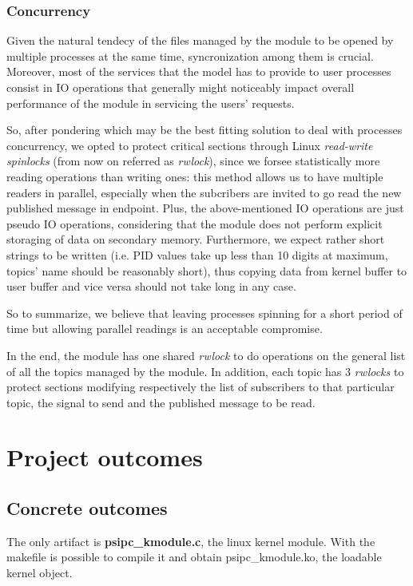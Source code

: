 \documentclass[10pt,a4]{article}
\begin{document}
\subsubsection*{Concurrency}
Given the natural tendecy of the files managed by the module to be opened by multiple processes at the same time, syncronization among them is crucial. Moreover, most of the services that the model has to provide to user processes consist in IO operations that generally might noticeably impact overall performance of the module in servicing the users' requests. 

So, after pondering which may be the best fitting solution to deal with processes concurrency, we opted to protect critical sections through Linux \textit{read-write spinlocks} (from now on referred as \textit{rwlock}), since we forsee statistically more reading operations than writing ones: this method allows us to have multiple readers in parallel, especially when the subcribers are invited to go read the new published message in endpoint. Plus, the above-mentioned IO operations are just pseudo IO operations, considering that the module does not perform explicit storaging of data on secondary memory. Furthermore, we expect rather short strings to be written (i.e. PID values take up less than 10 digits at maximum, topics' name should be reasonably short), thus copying data from kernel buffer to user buffer and vice versa should not take long in any case.

So to summarize, we believe that leaving processes spinning for a short period of time but allowing parallel readings is an acceptable compromise.

In the end, the module has one shared \textit{rwlock} to do operations on the general list of all the topics managed by the module. In addition, each topic has 3 \textit{rwlocks} to protect sections modifying respectively the list of subscribers to that particular topic, the signal to send and the published message to be read.


\section{Project outcomes}

\subsection{Concrete outcomes}
The only artifact is \textbf{psipc\_kmodule.c}, the linux kernel module.
With the makefile is possible to compile it and obtain psipc\_kmodule.ko, the loadable kernel object.
\end{document}
